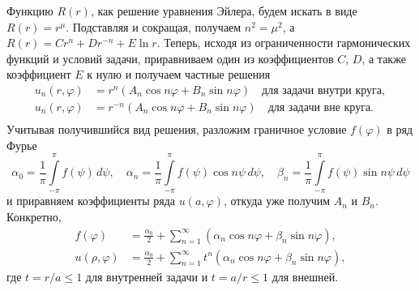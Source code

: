 Функцию $ R(r) $, как решение уравнения Эйлера, будем искать в виде $ R(r) = r^\mu $.
Подставляя и сокращая, получаем $ n^2 = \mu^2 $, а $ R(r) = Cr^n + Dr^{-n} +
E\ln r $.
Теперь, исходя из ограниченности гармонических функций и условий задачи, приравниваем один из
коэффициентов $ C $, $ D $, а также коэффициент $ E $ к нулю и получаем частные решения  
\begin{align*}
  u_n(r,\varphi) &= r^n(A_n\cos n\varphi + B_n \sin n\varphi) \quad \text{для
  задачи внутри круга},\\
    u_n(r,\varphi) &= r^{-n}(A_n\cos n\varphi + B_n \sin n\varphi) \quad \text{для
  задачи вне круга}.\\
\end{align*}
Учитывая получившийся вид решения, разложим граничное условие $ f(\varphi) $ в
ряд Фурье 
\begin{equation}
    \alpha_0 = \frac{1}{\pi}\int\limits_{-\pi}^{\pi}f(\psi)\,d\psi, \quad
    \alpha_n = \frac{1}{\pi}\int\limits_{-\pi}^{\pi}f(\psi)\cos
    n\psi\,d\psi,\quad
    \beta_n = \frac{1}{\pi}\int\limits_{-\pi}^{\pi}f(\psi)\sin n\psi\,d\psi
    \label{eq:fourier_exp}
\end{equation}
и приравняем коэффициенты ряда $ u(a, \varphi) $, откуда уже получим $ A_n $ и $ B_n $.
Конкретно, 
\begin{align}
  f(\varphi) &= \frac{\alpha_0}{2} + \sum_{n=1}^\infty(\alpha_n\cos n\varphi +
  \beta_n \sin n\varphi),\\
  u(\rho, \varphi) &= \frac{\alpha_0}{2} + \sum_{n=1}^\infty t^n (\alpha_n\cos
  n\varphi + \beta_n \sin n\varphi), \label{eq:fourier_sol}
\end{align}
где $ t = r/a \leqslant 1 $ для внутренней задачи и
$ t = a/r \leqslant 1 $ для внешней.




